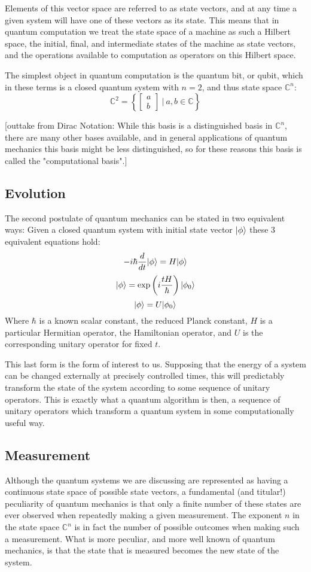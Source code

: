 Elements of this vector space are referred to as state vectors, and at any time a given system will have one of these vectors as its state. This means that in quantum computation we treat the state space of a machine as such a Hilbert space, the initial, final, and intermediate states of the machine as state vectors, and the operations available to computation as operators on this Hilbert space.

The simplest object in quantum computation is the quantum bit, or qubit, which in these terms is a closed quantum system with $n=2$, and thus state space $\mathbb{C}^n$:
\[
\mathbb{C}^2 = \left\{\left[\begin{matrix}
a\\
b
\end{matrix}\right]\ \bigg|\ a, b \in \mathbb{C}\right\}
\]

[outtake from Dirac Notation: While this basis is a distinguished basis in $\mathbb{C}^n$, there are many other bases available, and in general applications of quantum mechanics this basis might be less distinguished, so for these reasons this basis is called the "computational basis".]
\subsection{Evolution}
The second postulate of quantum mechanics can be stated in two equivalent ways: Given a closed quantum system with initial state vector $| \phi \rangle$ these 3 equivalent equations hold:
\[-i\hbar\frac{d}{dt}| \phi \rangle = H| \phi \rangle\]
\[| \phi \rangle = \exp\left(i \frac{tH}{\hbar}\right)| \phi_0 \rangle\]
\[| \phi \rangle = U| \phi_0 \rangle\]
Where $\hbar$ is a known scalar constant, the reduced Planck constant, $H$ is a particular Hermitian operator, the Hamiltonian operator, and $U$ is the corresponding unitary operator for fixed $t$.

This last form is the form of interest to us. Supposing that the energy of a system can be changed externally at precisely controlled times, this will predictably transform the state of the system according to some sequence of unitary operators. This is exactly what a quantum algorithm is then, a sequence of unitary operators which transform a quantum system in some computationally useful way.
\subsection{Measurement}
Although the quantum systems we are discussing are represented as having a continuous state space of possible state vectors, a fundamental (and titular!) peculiarity of quantum mechanics is that only a finite number of these states are ever observed when repeatedly making a given measurement. The exponent $n$ in the state space $\mathbb{C}^n$ is in fact the number of possible outcomes when making such a measurement. What is more peculiar, and more well known of quantum mechanics, is that the state that is measured becomes the new state of the system.

